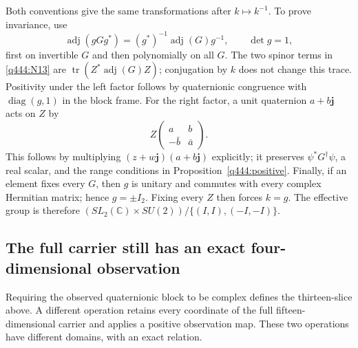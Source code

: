 Both conventions give the same transformations after $k\mapsto k^{-1}$.
To prove invariance, use
\[
 \operatorname{adj}(gGg^*)=(g^*)^{-1}\operatorname{adj}(G)g^{-1},
 \qquad \det g=1,
\]
first on invertible $G$ and then polynomially on all $G$.
The two spinor terms in \eqref{q444:N13} are
$\operatorname{tr}(Z^*\operatorname{adj}(G)Z)$; conjugation by $k$
does not change this trace. Positivity under the left factor follows by
quaternionic congruence with $\operatorname{diag}(g,1)$ in the block frame.
For the right factor, a unit quaternion $a+b\mathbf j$ acts on $Z$ by
\[
 Z\begin{pmatrix}a&b\\-\bar b&\bar a\end{pmatrix}.
\]
This follows by multiplying $(z+w\mathbf j)(a+b\mathbf j)$ explicitly;
it preserves $\psi^*G^\dagger\psi$, a real scalar, and the range conditions
in Proposition~\ref{q444:positive}.
Finally, if an element fixes every $G$, then $g$ is unitary and commutes
with every complex Hermitian matrix; hence $g=\pm I_2$.
Fixing every $Z$ then forces $k=g$. The effective group is therefore
$(SL_2(\mathbb C)\times SU(2))/\{(I,I),(-I,-I)\}$.

\subsection{The full carrier still has an exact four-dimensional observation}

Requiring the observed quaternionic block to be complex defines the
thirteen-slice above. A different operation retains every coordinate of
the full fifteen-dimensional carrier and applies a positive observation
map. These two operations have different domains, with an exact relation.

